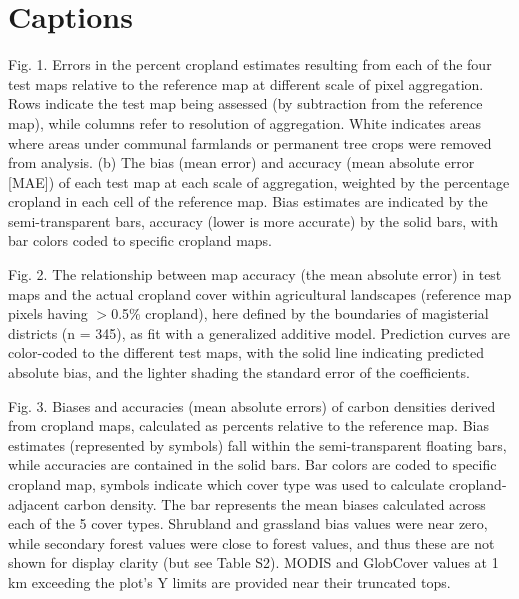 \documentclass[12 pt, titlepage, a4paper]{article}
\begin{document}
 
% 
{\footnotesize }


\section*{Captions}
\noindent
Fig. 1. Errors in the percent cropland estimates resulting from each of the four test maps relative to the reference map at different scale of pixel aggregation. Rows indicate the test map being assessed (by subtraction from the reference map), while columns refer to resolution of aggregation. White indicates areas where areas under communal farmlands or permanent tree crops were removed from analysis. (b) The bias (mean error) and accuracy (mean absolute error [MAE]) of each test map at each scale of aggregation, weighted by the percentage cropland in each cell of the reference map. Bias estimates are indicated by the semi-transparent bars, accuracy (lower is more accurate) by the solid bars, with bar colors coded to specific cropland maps.

\vspace{10pt}
\noindent Fig. 2. The relationship between map accuracy (the mean absolute error) in test maps and the actual cropland cover within agricultural landscapes (reference map pixels having $>$0.5\% cropland), here defined by the boundaries of magisterial districts (n = 345), as fit with a generalized additive model. Prediction curves are color-coded to the different test maps, with the solid line indicating predicted absolute bias, and the lighter shading the standard error of the coefficients.

\vspace{10pt}
\noindent Fig. 3. Biases and accuracies (mean absolute errors) of carbon densities derived from cropland maps, calculated as percents relative to the reference map. Bias estimates (represented by symbols) fall within the semi-transparent floating bars, while accuracies are contained in the solid bars. Bar colors are coded to specific cropland map, symbols indicate which cover type was used to calculate cropland-adjacent carbon density. The bar represents the mean biases calculated across each of the 5 cover types. Shrubland and grassland bias values were near zero, while secondary forest values were close to forest values, and thus these are not shown for display clarity (but see Table S2). MODIS and GlobCover values at 1 km exceeding the plot's Y limits are provided near their truncated tops.
\end{document}
